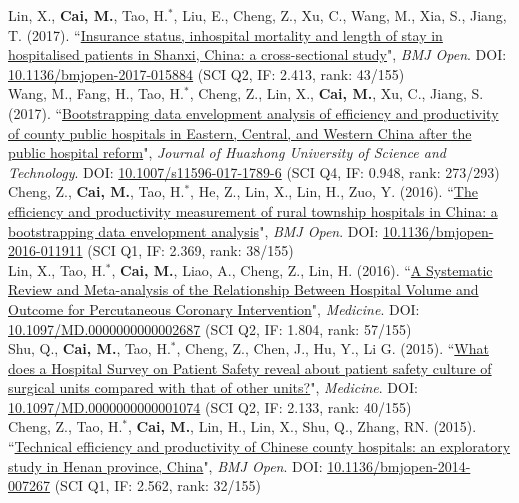 \documentclass[11pt, a4paper]{article}
\newcommand{\years}[1]{\marginnote{\scriptsize #1}}
\begin{document}
\years{2017}Lin, X., \textbf{Cai, M.}, Tao, H.$^\ast$, Liu, E., Cheng, Z., Xu, C., Wang, M., Xia, S., Jiang, T. (2017). ``\ul{Insurance status, inhospital mortality and length of stay in hospitalised patients in Shanxi, China: a cross-sectional study}", \emph{BMJ Open}. DOI: \href{https://doi.org/10.1136/bmjopen-2017-015884}{10.1136/bmjopen-2017-015884} (SCI Q2, IF: 2.413, rank: 43/155)\\[6pt]
\years{2017}Wang, M., Fang, H., Tao, H.$^\ast$, Cheng, Z., Lin, X., \textbf{Cai, M.}, Xu, C., Jiang, S. (2017). ``\ul{Bootstrapping data envelopment analysis of efficiency and productivity of county public hospitals in Eastern, Central, and Western China after the public hospital reform}", \emph{Journal of Huazhong University of Science and Technology}. DOI: \href{https://doi.org/10.1007/s11596-017-1789-6}{10.1007/s11596-017-1789-6} (SCI Q4, IF: 0.948, rank: 273/293)\\[6pt]
\years{2016}Cheng, Z., \textbf{Cai, M.}, Tao, H.$^\ast$, He, Z., Lin, X., Lin, H., Zuo, Y. (2016). ``\ul{The efficiency and productivity measurement of rural township hospitals in China: a bootstrapping data envelopment analysis}", \emph{BMJ Open}. DOI: \href{https://doi.org/10.1136/bmjopen-2016-011911}{10.1136/bmjopen-2016-011911} (SCI Q1, IF: 2.369, rank: 38/155)\\[6pt]
\years{2016}Lin, X., Tao, H.$^\ast$, \textbf{Cai, M.}, Liao, A., Cheng, Z., Lin, H. (2016). ``\ul{A Systematic Review and Meta-analysis of the Relationship Between Hospital Volume and Outcome for Percutaneous Coronary Intervention}", \emph{Medicine}. DOI: \href{https://doi.org/10.1097/MD.0000000000002687}{10.1097/MD.0000000000002687} (SCI Q2, IF: 1.804, rank: 57/155)\\[6pt]
\years{2015}Shu, Q., \textbf{Cai, M.}, Tao, H.$^\ast$, Cheng, Z., Chen, J., Hu, Y., Li G. (2015). ``\ul{What does a Hospital Survey on Patient Safety reveal about patient safety culture of surgical units compared with that of other units?}", \emph{Medicine}. DOI: \href{https://doi.org/10.1097/MD.0000000000001074}{10.1097/MD.0000000000001074} (SCI Q2, IF: 2.133, rank: 40/155)\\[6pt]
\years{2015}Cheng, Z., Tao, H.$^\ast$, \textbf{Cai, M.}, Lin, H., Lin, X., Shu, Q., Zhang, RN. (2015). ``\ul{Technical efficiency and productivity of Chinese county hospitals: an exploratory study in Henan province, China}", \emph{BMJ Open}. DOI: \href{https://doi.org/10.1136/bmjopen-2014-007267}{10.1136/bmjopen-2014-007267} (SCI Q1, IF: 2.562, rank: 32/155)
\end{document}
